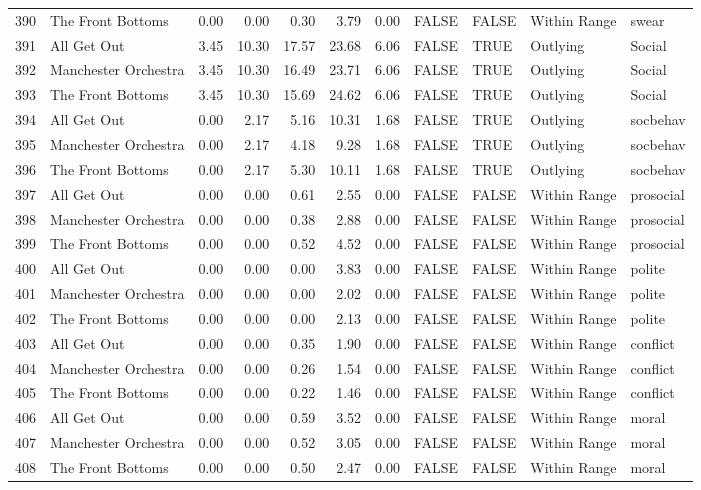 \begin{table}[ht]
\begin{tabular}{rlrrrrrllll}
  390 & The Front Bottoms & 0.00 & 0.00 & 0.30 & 3.79 & 0.00 & FALSE & FALSE & Within Range & swear \\ 
  391 & All Get Out & 3.45 & 10.30 & 17.57 & 23.68 & 6.06 & FALSE & TRUE & Outlying & Social \\ 
  392 & Manchester Orchestra & 3.45 & 10.30 & 16.49 & 23.71 & 6.06 & FALSE & TRUE & Outlying & Social \\ 
  393 & The Front Bottoms & 3.45 & 10.30 & 15.69 & 24.62 & 6.06 & FALSE & TRUE & Outlying & Social \\ 
  394 & All Get Out & 0.00 & 2.17 & 5.16 & 10.31 & 1.68 & FALSE & TRUE & Outlying & socbehav \\ 
  395 & Manchester Orchestra & 0.00 & 2.17 & 4.18 & 9.28 & 1.68 & FALSE & TRUE & Outlying & socbehav \\ 
  396 & The Front Bottoms & 0.00 & 2.17 & 5.30 & 10.11 & 1.68 & FALSE & TRUE & Outlying & socbehav \\ 
  397 & All Get Out & 0.00 & 0.00 & 0.61 & 2.55 & 0.00 & FALSE & FALSE & Within Range & prosocial \\ 
  398 & Manchester Orchestra & 0.00 & 0.00 & 0.38 & 2.88 & 0.00 & FALSE & FALSE & Within Range & prosocial \\ 
  399 & The Front Bottoms & 0.00 & 0.00 & 0.52 & 4.52 & 0.00 & FALSE & FALSE & Within Range & prosocial \\ 
  400 & All Get Out & 0.00 & 0.00 & 0.00 & 3.83 & 0.00 & FALSE & FALSE & Within Range & polite \\ 
  401 & Manchester Orchestra & 0.00 & 0.00 & 0.00 & 2.02 & 0.00 & FALSE & FALSE & Within Range & polite \\ 
  402 & The Front Bottoms & 0.00 & 0.00 & 0.00 & 2.13 & 0.00 & FALSE & FALSE & Within Range & polite \\ 
  403 & All Get Out & 0.00 & 0.00 & 0.35 & 1.90 & 0.00 & FALSE & FALSE & Within Range & conflict \\ 
  404 & Manchester Orchestra & 0.00 & 0.00 & 0.26 & 1.54 & 0.00 & FALSE & FALSE & Within Range & conflict \\ 
  405 & The Front Bottoms & 0.00 & 0.00 & 0.22 & 1.46 & 0.00 & FALSE & FALSE & Within Range & conflict \\ 
  406 & All Get Out & 0.00 & 0.00 & 0.59 & 3.52 & 0.00 & FALSE & FALSE & Within Range & moral \\ 
  407 & Manchester Orchestra & 0.00 & 0.00 & 0.52 & 3.05 & 0.00 & FALSE & FALSE & Within Range & moral \\ 
  408 & The Front Bottoms & 0.00 & 0.00 & 0.50 & 2.47 & 0.00 & FALSE & FALSE & Within Range & moral \\ 

\end{tabular}
\end{table}
